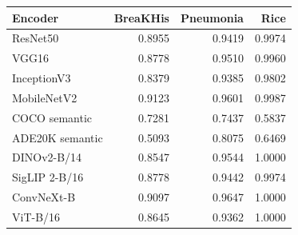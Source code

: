 \begin{tabular}{lrrr}
\toprule
Encoder & BreaKHis & Pneumonia & Rice\\
\midrule
ResNet50 & 0.8955 & 0.9419 & 0.9974\\
VGG16 & 0.8778 & 0.9510 & 0.9960\\
InceptionV3 & 0.8379 & 0.9385 & 0.9802\\
MobileNetV2 & 0.9123 & 0.9601 & 0.9987\\
COCO semantic & 0.7281 & 0.7437 & 0.5837\\
ADE20K semantic & 0.5093 & 0.8075 & 0.6469\\
DINOv2-B/14 & 0.8547 & 0.9544 & 1.0000\\
SigLIP 2-B/16 & 0.8778 & 0.9442 & 0.9974\\
ConvNeXt-B & 0.9097 & 0.9647 & 1.0000\\
ViT-B/16 & 0.8645 & 0.9362 & 1.0000\\
\bottomrule
\end{tabular}
